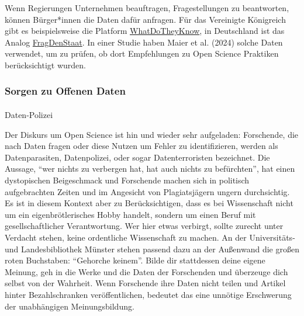 \documentclass[
  letterpaper,
  DIV=11,
  numbers=noendperiod]{scrreprt}
\makeatletter
\let\oldparagraph\paragraph
\renewcommand{\paragraph}{
    \@ifstar
      \xxxParagraphStar
      \xxxParagraphNoStar
  }
\newcommand{\xxxParagraphStar}[1]{\oldparagraph*{#1}\mbox{}}
\newcommand{\xxxParagraphNoStar}[1]{\oldparagraph{#1}\mbox{}}
\makeatother
\begin{document}
\begin{tcolorbox}[enhanced jigsaw, title=\textcolor{quarto-callout-note-color}{\faInfo}\hspace{0.5em}{Forschungsdaten bei Regierungen anfragen}, colbacktitle=quarto-callout-note-color!10!white, rightrule=.15mm, titlerule=0mm, left=2mm, bottomrule=.15mm, arc=.35mm, leftrule=.75mm, toprule=.15mm, opacityback=0, breakable, bottomtitle=1mm, colframe=quarto-callout-note-color-frame, toptitle=1mm, opacitybacktitle=0.6, coltitle=black, colback=white]

Wenn Regierungen Unternehmen beauftragen, Fragestellungen zu
beantworten, können Bürger*innen die Daten dafür anfragen. Für das
Vereinigte Königreich gibt es beispielsweise die Platform
\href{https://www.whatdotheyknow.com/request/trial_protocols_behavioural_insi_2}{WhatDoTheyKnow},
in Deutschland ist das Analog
\href{https://fragdenstaat.de}{FragDenStaat}. In einer Studie haben
Maier et al. (2024) solche Daten verwendet, um zu prüfen, ob dort
Empfehlungen zu Open Science Praktiken berücksichtigt wurden.

\end{tcolorbox}

\subsubsection{Sorgen zu Offenen Daten}\label{sorgen-zu-offenen-daten}

\paragraph{Daten-Polizei}\label{daten-polizei}

Der Diskurs um Open Science ist hin und wieder sehr aufgeladen:
Forschende, die nach Daten fragen oder diese Nutzen um Fehler zu
identifizieren, werden als Datenparasiten, Datenpolizei, oder sogar
Datenterroristen bezeichnet. Die Aussage, ``wer nichts zu verbergen hat,
hat auch nichts zu befürchten'', hat einen dystopischen Beigeschmack und
Forschende machen sich in politisch aufgebrachten Zeiten und im
Angesicht von Plagiatsjägern ungern durchsichtig. Es ist in diesem
Kontext aber zu Berücksichtigen, dass es bei Wissenschaft nicht um ein
eigenbrötlerisches Hobby handelt, sondern um einen Beruf mit
gesellschaftlicher Verantwortung. Wer hier etwas verbirgt, sollte
zurecht unter Verdacht stehen, keine ordentliche Wissenschaft zu machen.
An der Universitäts- und Landesbibliothek Münster stehen passend dazu an
der Außenwand die großen roten Buchstaben: ``Gehorche keinem''. Bilde
dir stattdessen deine eigene Meinung, geh in die Werke und die Daten der
Forschenden und überzeuge dich selbst von der Wahrheit. Wenn Forschende
ihre Daten nicht teilen und Artikel hinter Bezahlschranken
veröffentlichen, bedeutet das eine unnötige Erschwerung der unabhängigen
Meinungsbildung.
\end{document}
